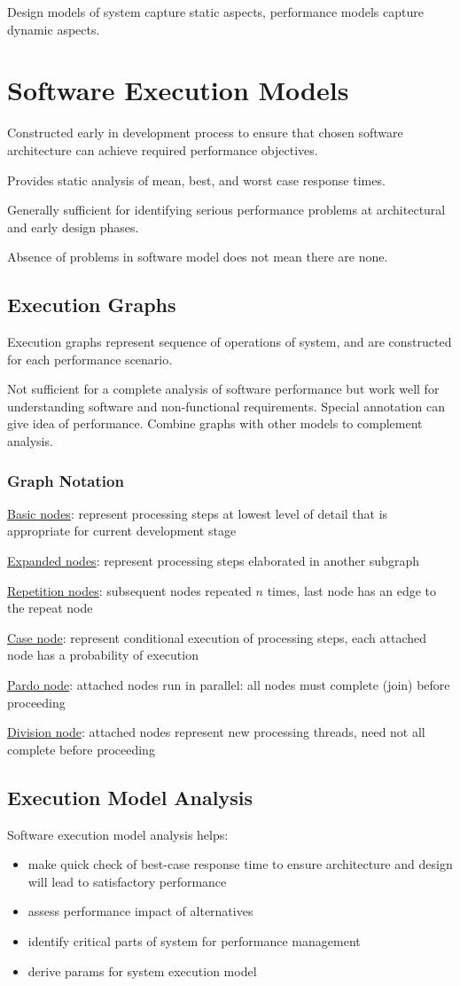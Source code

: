 \documentclass[11pt]{article}
\begin{document}
Design models of system capture static aspects, performance models capture
dynamic aspects.
\section{Software Execution Models}
\label{sec:org3ce5478}
Constructed early in development process to ensure that chosen software
architecture can achieve required performance objectives.

Provides static analysis of mean, best, and worst case response times.

Generally sufficient for identifying serious performance problems at
architectural and early design phases.

Absence of problems in software model does not mean there are none.
\subsection{Execution Graphs}
\label{sec:orgc6c15d1}
Execution graphs represent sequence of operations of system, and are constructed
for each performance scenario.

Not sufficient for a complete analysis of software performance but work well
for understanding software and non-functional requirements.
Special annotation can give idea of performance.
Combine graphs with other models to complement analysis.
\subsubsection{Graph Notation}
\label{sec:orgfb1c861}
\uline{Basic nodes}: represent processing steps at lowest level of detail
that is appropriate for current development stage

\uline{Expanded nodes}: represent processing steps elaborated in another subgraph

\uline{Repetition nodes}: subsequent nodes repeated \(n\) times, last node has an edge
to the repeat node

\uline{Case node}: represent conditional execution of processing steps, each
attached node has a probability of execution

\uline{Pardo node}: attached nodes run in parallel: all nodes must complete (join)
before proceeding

\uline{Division node}: attached nodes represent new processing threads, need not all
complete before proceeding
\subsection{Execution Model Analysis}
\label{sec:orgd8f9ef1}
Software execution model analysis helps:
\begin{itemize}
\item make quick check of best-case response time to ensure architecture
and design will lead to satisfactory performance
\item assess performance impact of alternatives
\item identify critical parts of system for performance management
\item derive params for system execution model
\end{itemize}
\end{document}
